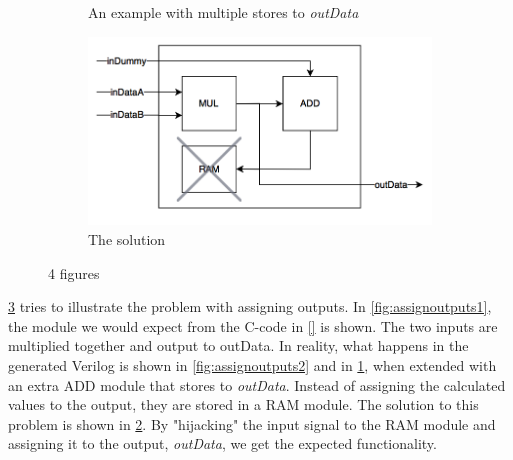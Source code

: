 \begin{figure}
\begin{subfigure}{0.49\textwidth}
                \caption{An example with multiple stores to \textit{outData}}
  \label{fig:assignoutputs3}
       \end{subfigure}%
    \hfill
        \begin{subfigure}{0.49\textwidth}\centering
                    \includegraphics[width=\linewidth]{figs/OutputAssignment4.png}
                \caption{The solution}
  \label{fig:assignoutputs4}
       \end{subfigure}%

\caption{4 figures}
\label{fig:assigningoutputs}
 \end{figure}
\cref{fig:assigningoutputs} tries to illustrate the problem with assigning outputs. In \cref{fig:assignoutputs1}, the module we would expect from the C-code in \cref{} is shown. The two inputs are multiplied together and output to outData. In reality, what happens in the generated Verilog is shown in \cref{fig:assignoutputs2} and in \cref{fig:assignoutputs3}, when extended with an extra ADD module that stores to \textit{outData}. Instead of assigning the calculated values to the output, they are stored in a RAM module. The solution to this problem is shown in \cref{fig:assignoutputs4}. By "hijacking" the input signal to the RAM module and assigning it to the output, \textit{outData}, we get the expected functionality. 


